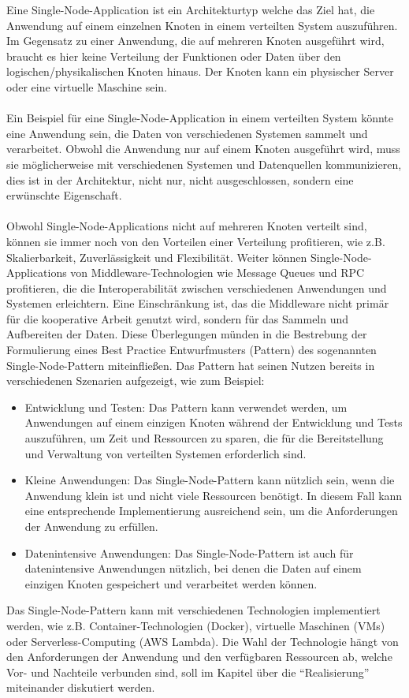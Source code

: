 Eine Single-Node-Application ist ein Architekturtyp welche das Ziel hat, die Anwendung auf einem einzelnen Knoten in einem verteilten System auszuführen. Im Gegensatz zu einer Anwendung, die auf mehreren Knoten ausgeführt wird, braucht es hier keine Verteilung der Funktionen oder Daten über den logischen/physikalischen Knoten hinaus. Der Knoten kann ein physischer Server oder eine virtuelle Maschine sein.
\\\\
Ein Beispiel für eine Single-Node-Application in einem verteilten System könnte eine Anwendung sein, die Daten von verschiedenen Systemen sammelt und verarbeitet. Obwohl die Anwendung nur auf einem Knoten ausgeführt wird, muss sie möglicherweise mit verschiedenen Systemen und Datenquellen kommunizieren, dies ist in der Architektur, nicht nur, nicht ausgeschlossen, sondern eine erwünschte Eigenschaft.
\\\\
Obwohl Single-Node-Applications nicht auf mehreren Knoten verteilt sind, können sie immer noch von den Vorteilen einer Verteilung profitieren, wie z.B. Skalierbarkeit, Zuverlässigkeit und Flexibilität. Weiter können
Single-Node-Applications von Middleware-Technologien wie Message Queues und RPC profitieren, die die Interoperabilität zwischen verschiedenen Anwendungen und Systemen erleichtern. Eine Einschränkung ist, das die Middleware nicht primär für die kooperative Arbeit genutzt wird, sondern für das Sammeln und Aufbereiten der Daten. Diese Überlegungen münden in die Bestrebung der Formulierung eines Best Practice Entwurfmusters (Pattern) des sogenannten Single-Node-Pattern miteinfließen. Das Pattern hat seinen Nutzen bereits in verschiedenen Szenarien aufgezeigt, wie zum Beispiel:
\begin{itemize}
\item Entwicklung und Testen: Das Pattern kann verwendet werden, um Anwendungen auf einem einzigen Knoten während der Entwicklung und Tests auszuführen, um Zeit und Ressourcen zu sparen, die für die Bereitstellung und Verwaltung von verteilten Systemen erforderlich sind.
\item Kleine Anwendungen: Das Single-Node-Pattern kann nützlich sein, wenn die Anwendung klein ist und nicht viele Ressourcen benötigt. In diesem Fall kann eine entsprechende Implementierung ausreichend sein, um die Anforderungen der Anwendung zu erfüllen.
\item Datenintensive Anwendungen: Das Single-Node-Pattern ist auch für datenintensive Anwendungen nützlich, bei denen die Daten auf einem einzigen Knoten gespeichert und verarbeitet werden können.
\end{itemize}
Das Single-Node-Pattern kann mit verschiedenen Technologien implementiert werden, wie z.B. Container-Technologien (Docker), virtuelle Maschinen (VMs) oder Serverless-Computing (AWS Lambda). Die Wahl der Technologie hängt von den Anforderungen der Anwendung und den verfügbaren Ressourcen ab, welche Vor- und Nachteile verbunden sind, soll im Kapitel über die \enquote{Realisierung} miteinander diskutiert werden. 

